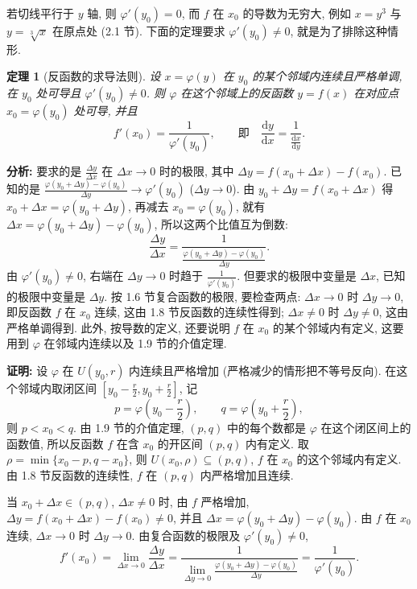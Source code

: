 \documentclass[UTF8,openany]{ctexbook}
\theoremstyle{chinesetextbook}
\newtheorem{theorem}{定理}[section]
\newenvironment{cnproof}{\par\indent\textbf{证明:} \ignorespaces}{\par}
\newcommand{\dd}{\mathrm d}
\begin{document}
若切线平行于 $y$ 轴, 则 $\varphi'(y_0)=0$, 而 $f$ 在 $x_0$ 的导数为无穷大, 例如 $x=y^3$ 与 $y=\sqrt[3]x$ 在原点处 (2.1 节). 下面的定理要求 $\varphi'(y_0)\ne0$, 就是为了排除这种情形.
\begin{theorem}[反函数的求导法则]\label{thm:c2-2-inv}
设 $x=\varphi(y)$ 在 $y_0$ 的某个邻域内连续且严格单调, 在 $y_0$ 处可导且 $\varphi'(y_0)\ne0$. 则 $\varphi$ 在这个邻域上的反函数 $y=f(x)$ 在对应点 $x_0=\varphi(y_0)$ 处可导, 并且
\[
f'(x_0)=\frac1{\varphi'(y_0)},\qquad\text{即}\quad\frac{\dd y}{\dd x}=\frac1{\displaystyle\frac{\dd x}{\dd y}}.
\]
\end{theorem}
\par\indent\textbf{分析:} 要求的是 $\displaystyle\frac{\Delta y}{\Delta x}$ 在 $\Delta x\to0$ 时的极限, 其中 $\Delta y=f(x_0+\Delta x)-f(x_0)$. 已知的是 $\displaystyle\frac{\varphi(y_0+\Delta y)-\varphi(y_0)}{\Delta y}\to\varphi'(y_0)$ ($\Delta y\to0$). 由 $y_0+\Delta y=f(x_0+\Delta x)$ 得 $x_0+\Delta x=\varphi(y_0+\Delta y)$, 再减去 $x_0=\varphi(y_0)$, 就有 $\Delta x=\varphi(y_0+\Delta y)-\varphi(y_0)$, 所以这两个比值互为倒数:
\[
\frac{\Delta y}{\Delta x}=\frac1{\displaystyle\frac{\varphi(y_0+\Delta y)-\varphi(y_0)}{\Delta y}}.
\]
由 $\varphi'(y_0)\ne0$, 右端在 $\Delta y\to0$ 时趋于 $\displaystyle\frac1{\varphi'(y_0)}$. 但要求的极限中变量是 $\Delta x$, 已知的极限中变量是 $\Delta y$. 按 1.6 节复合函数的极限, 要检查两点: $\Delta x\to0$ 时 $\Delta y\to0$, 即反函数 $f$ 在 $x_0$ 连续, 这由 1.8 节反函数的连续性得到; $\Delta x\ne0$ 时 $\Delta y\ne0$, 这由严格单调得到. 此外, 按导数的定义, 还要说明 $f$ 在 $x_0$ 的某个邻域内有定义, 这要用到 $\varphi$ 在邻域内连续以及 1.9 节的介值定理.
\begin{cnproof}
设 $\varphi$ 在 $U(y_0,r)$ 内连续且严格增加 (严格减少的情形把不等号反向). 在这个邻域内取闭区间 $\displaystyle\left[y_0-\frac r2,y_0+\frac r2\right]$, 记
\[
p=\varphi\left(y_0-\frac r2\right),\qquad q=\varphi\left(y_0+\frac r2\right),
\]
则 $p<x_0<q$. 由 1.9 节的介值定理, $(p,q)$ 中的每个数都是 $\varphi$ 在这个闭区间上的函数值, 所以反函数 $f$ 在含 $x_0$ 的开区间 $(p,q)$ 内有定义. 取 $\rho=\min\{x_0-p,q-x_0\}$, 则 $U(x_0,\rho)\subseteq(p,q)$, $f$ 在 $x_0$ 的这个邻域内有定义. 由 1.8 节反函数的连续性, $f$ 在 $(p,q)$ 内严格增加且连续.

当 $x_0+\Delta x\in(p,q)$, $\Delta x\ne0$ 时, 由 $f$ 严格增加, $\Delta y=f(x_0+\Delta x)-f(x_0)\ne0$, 并且 $\Delta x=\varphi(y_0+\Delta y)-\varphi(y_0)$. 由 $f$ 在 $x_0$ 连续, $\Delta x\to0$ 时 $\Delta y\to0$. 由复合函数的极限及 $\varphi'(y_0)\ne0$,
\[
f'(x_0)=\lim_{\Delta x\to0}\frac{\Delta y}{\Delta x}=\frac1{\displaystyle\lim_{\Delta y\to0}\frac{\varphi(y_0+\Delta y)-\varphi(y_0)}{\Delta y}}=\frac1{\varphi'(y_0)}.
\]
\end{cnproof}
\end{document}
